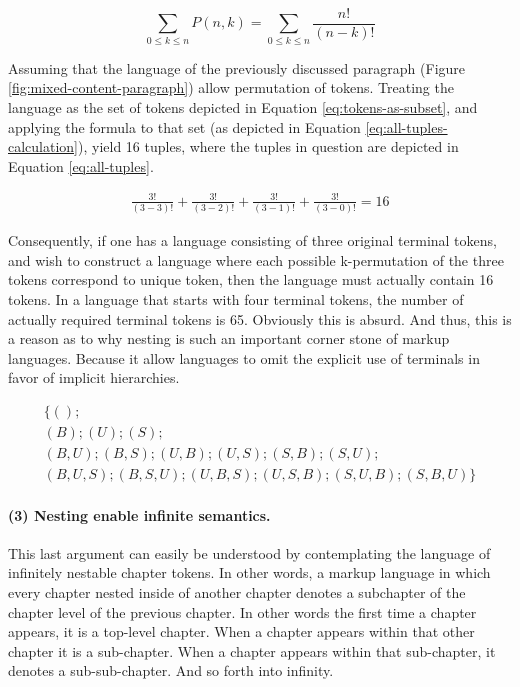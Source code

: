 \documentclass{scrreprt}
\begin{document}
\begin{equation}
\sum_{0\leq{k}\leq{n}} P(n,k) = 
\sum_{0\leq{k}\leq{n}} \frac{n!}{(n-k)!}
\label{eq:formula-permutations}
\end{equation}

Assuming that the language of the previously discussed paragraph (Figure \ref{fig:mixed-content-paragraph}) allow permutation of tokens. Treating the language as the set of tokens depicted in Equation \ref{eq:tokens-as-subset}, and applying the formula to that set (as depicted in Equation \ref{eq:all-tuples-calculation}), yield 16 tuples, where the tuples in question are depicted in Equation \ref{eq:all-tuples}.



\begin{equation}
\begin{split}
\frac{3!}{(3-3)!} + \frac{3!}{(3-2)!} + \frac{3!}{(3-1)!} + \frac{3!}{(3-0)!} = 
16
\label{eq:all-tuples-calculation}
\end{split}
\end{equation}



Consequently, if one has a language consisting of three original terminal tokens, and wish to construct a language where each possible k-permutation of the three tokens correspond to unique token, then the language must actually contain 16 tokens. In a language that starts with four terminal tokens, the number of actually required terminal tokens is 65. Obviously this is absurd. And thus, this is a reason as to why nesting is such an important corner stone of markup languages. Because it allow languages to omit the explicit use of terminals in favor of implicit hierarchies.




\begin{equation}
\begin{split}
\{
(); \\
(B);
(U);
(S); \\
(B,U);
(B,S);
(U,B);
(U,S);
(S,B);
(S,U); \\
(B,U,S);
(B,S,U);
(U,B,S);
(U,S,B);
(S,U,B);
(S,B,U)
\}
\label{eq:all-tuples}
\end{split}
\end{equation}






\paragraph{(3) Nesting enable infinite semantics.}
This last argument can easily be understood by contemplating the language of infinitely nestable chapter tokens. In other words, a markup language in which every chapter nested inside of another chapter denotes a subchapter of the chapter level of the previous chapter. In other words the first time a chapter appears, it is a top-level chapter. When a chapter appears within that other chapter it is a sub-chapter. When a chapter appears within that sub-chapter, it denotes a sub-sub-chapter. And so forth into infinity.
\end{document}
